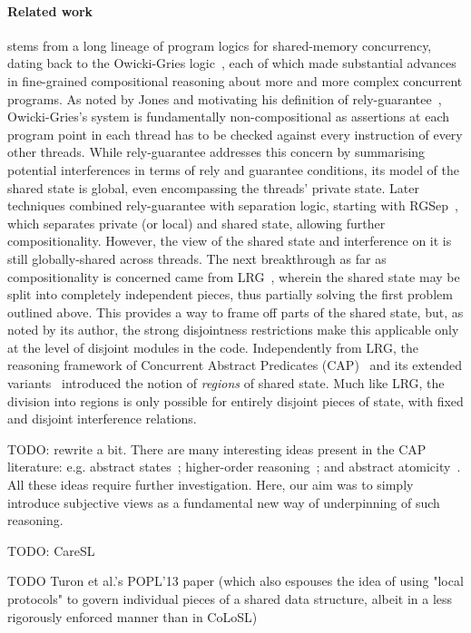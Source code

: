 \paragraph{Related work}
\colosl stems from a long lineage of program logics for shared-memory
concurrency, dating back to the Owicki-Gries logic~\cite{og}, each of
which made substantial advances in fine-grained compositional
reasoning about more and more complex concurrent programs. As noted by
Jones and motivating his definition of rely-guarantee~\cite{rg},
Owicki-Gries's system is fundamentally non-compositional as assertions
at each program point in each thread has to be checked against every
instruction of every other threads. While rely-guarantee addresses
this concern by summarising potential interferences in terms of rely
and guarantee conditions, its model of the shared state is global,
even encompassing the threads' private state. Later techniques
combined rely-guarantee with separation logic, starting with
RGSep~\cite{viktor-marriage}, which separates private (or local) and
shared state, allowing further compositionality. However, the view of
the shared state and interference on it is still globally-shared
across threads. The next breakthrough as far as compositionality is
concerned came from LRG~\cite{lrg}, wherein the shared state may be
split into completely independent pieces, thus partially solving the
first problem outlined above. This provides a way to frame off parts
of the shared state, but, as noted by its author, the strong
disjointness restrictions make this applicable only at the level of
disjoint modules in the code. Independently from LRG, the reasoning
framework of Concurrent Abstract Predicates (CAP)~\cite{cap-ecoop10}
and its extended variants~\cite{icap,tada} introduced the notion
of \emph{regions} of shared state. Much like LRG, the division into
regions is only possible for entirely disjoint pieces of state, with
fixed and disjoint interference relations.

TODO: rewrite a bit.
There are many interesting ideas present in the CAP literature:
e.g. abstract states~\cite{caresl}; higher-order
reasoning~\cite{icap}; and abstract atomicity~\cite{tada}. All these
ideas require further investigation. Here, our aim was to simply
introduce subjective views as a fundamental new way of underpinning of
such reasoning.

TODO: CareSL

TODO Turon et al.'s POPL'13 paper (which also espouses the idea of
using "local protocols" to govern individual pieces of a shared data
structure, albeit in a less rigorously enforced manner than in CoLoSL)

